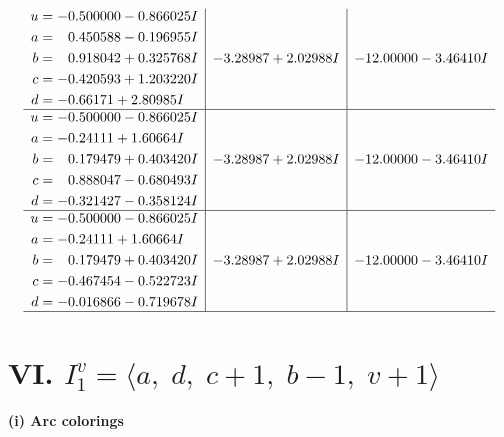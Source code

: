 \documentclass[1p]{elsarticle_modified}
\theoremstyle{definition}
\begin{document}
$$\begin{array}{c|c|c}
\begin{aligned}
u &= -0.500000 - 0.866025 I \\
a &= \phantom{-}0.450588 - 0.196955 I \\
b &= \phantom{-}0.918042 + 0.325768 I \\
c &= -0.420593 + 1.203220 I \\
d &= -0.66171 + 2.80985 I\end{aligned}
 & -3.28987 + 2.02988 I & -12.00000 - 3.46410 I \\ \hline\begin{aligned}
u &= -0.500000 - 0.866025 I \\
a &= -0.24111 + 1.60664 I \\
b &= \phantom{-}0.179479 + 0.403420 I \\
c &= \phantom{-}0.888047 - 0.680493 I \\
d &= -0.321427 - 0.358124 I\end{aligned}
 & -3.28987 + 2.02988 I & -12.00000 - 3.46410 I \\ \hline\begin{aligned}
u &= -0.500000 - 0.866025 I \\
a &= -0.24111 + 1.60664 I \\
b &= \phantom{-}0.179479 + 0.403420 I \\
c &= -0.467454 - 0.522723 I \\
d &= -0.016866 - 0.719678 I\end{aligned}
 & -3.28987 + 2.02988 I & -12.00000 - 3.46410 I\\
 \hline 
 \end{array}$$\newpage\newpage\renewcommand{\arraystretch}{1}
\centering \section*{VI. $I^v_{1}= \langle a,\;d,\;c+1,\;b-1,\;v+1 \rangle$}
\flushleft \textbf{(i) Arc colorings}\\
\end{document}
